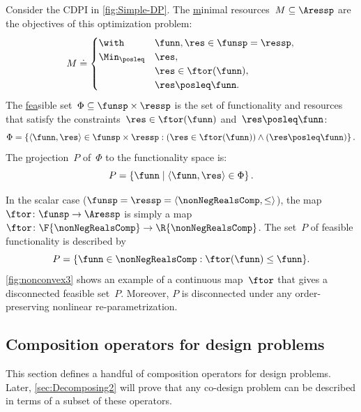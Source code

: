 \medskip{}

\begin{example}
\label{exa:one}Consider the CDPI in \cref{fig:Simple-DP}. The \uline{m}inimal
resources~$M\subseteq\Aressp$ are the objectives of this optimization
problem:
\[
M\doteq\begin{cases}
\with & \funn,\res\in\funsp=\ressp,\\
\Min_{\posleq} & \res,\\
 & \res\in\ftor(\funn),\\
 & \res\posleq\funn.
\end{cases}
\]
The \uline{fea}sible set~$\Phi\subseteq\funsp\times\ressp$ is
the set of functionality and resources that satisfy the constraints~$\res\in\ftor(\funn)$
and~$\res\posleq\funn$:
\begin{equation}
\Phi=\left\{ \langle\funn,\res\rangle\in\funsp\times\ressp:(\res\in\ftor(\funn))\wedge(\res\posleq\funn)\right\} .\label{eq:feasible}
\end{equation}
The \uline{p}rojection~$P$ of~$\Phi$ to the functionality space
is:
\[
P=\left\{ \funn\mid\left\langle \funn,\res\right\rangle \in\Phi\right\} .
\]

In the scalar case ($\funsp=\ressp=\langle\nonNegRealsComp,\leq\rangle$),
the map~$\ftor\colon\funsp\rightarrow\Aressp$ is simply a map~$\ftor\colon\F{\nonNegRealsComp}\rightarrow\R{\nonNegRealsComp}$.
The set~$P$ of feasible functionality is described by
\begin{equation}
P=\{\funn\in\nonNegRealsComp:\ftor(\funn)\leq\funn\}.\label{eq:Pfeasible}
\end{equation}
\cref{fig:nonconvex3} shows an example of a continuous map~$\ftor$
that gives a disconnected feasible set~$P$. Moreover, $P$ is disconnected
under any order-preserving nonlinear re-parametrization.

\end{example}


\subsection{Composition operators for design problems}

This section defines a handful of composition operators for design
problems. Later, \cref{sec:Decomposing2} will prove that any co-design
problem can be described in terms of a subset of these operators. 

